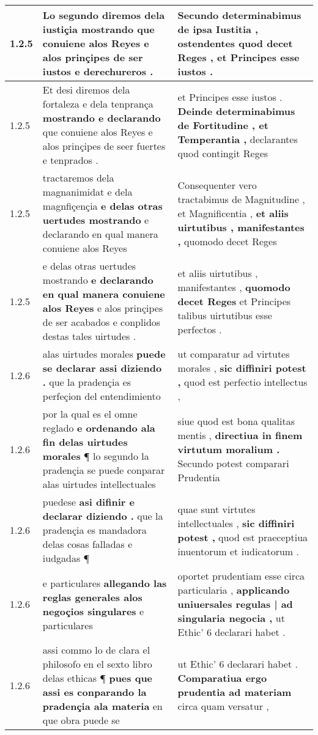 \begin{tabular}{|p{1cm}|p{6.5cm}|p{6.5cm}|}
1.2.5 & Lo segundo diremos dela iustiçia \textbf{ mostrando que conuiene alos Reyes } e alos prinçipes de ser iustos e derechureros . & Secundo determinabimus de ipsa Iustitia , \textbf{ ostendentes quod decet Reges , } et Principes esse iustos . \\\hline
1.2.5 & Et desi diremos dela fortaleza e dela tenprança \textbf{ mostrando e declarando } que conuiene alos Reyes e alos prinçipes de seer fuertes e tenprados . & et Principes esse iustos . \textbf{ Deinde determinabimus de Fortitudine , et Temperantia , } declarantes quod contingit Reges \\\hline
1.2.5 & tractaremos dela magnanimidat e dela magnfiçençia \textbf{ e delas otras uertudes mostrando } e declarando en qual manera conuiene alos Reyes & Consequenter vero tractabimus de Magnitudine , et Magnificentia , \textbf{ et aliis uirtutibus , manifestantes , } quomodo decet Reges \\\hline
1.2.5 & e delas otras uertudes mostrando \textbf{ e declarando en qual manera conuiene alos Reyes } e alos prinçipes de ser acabados e conplidos destas tales uirtudes . & et aliis uirtutibus , manifestantes , \textbf{ quomodo decet Reges } et Principes talibus uirtutibus esse perfectos . \\\hline
1.2.6 & alas uirtudes morales \textbf{ puede se declarar assi diziendo . } que la pradençia es perfeçion del entendimiento & ut comparatur ad virtutes morales , \textbf{ sic diffiniri potest , } quod est perfectio intellectus , \\\hline
1.2.6 & por la qual es el omne reglado \textbf{ e ordenando ala fin delas uirtudes morales } ¶ lo segundo la pradençia se puede conparar alas uirtudes intellectuales & siue quod est bona qualitas mentis , \textbf{ directiua in finem virtutum moralium . } Secundo potest comparari Prudentia \\\hline
1.2.6 & puedese \textbf{ asi difinir e declarar diziendo . } que la pradençia es mandadora delas cosas falladas e iudgadas ¶ & quae sunt virtutes intellectuales , \textbf{ sic diffiniri potest , } quod est praeceptiua inuentorum et iudicatorum . \\\hline
1.2.6 & e particulares \textbf{ allegando las reglas generales alos negoçios singulares } e particulares & oportet prudentiam esse circa particularia , \textbf{ applicando uniuersales regulas | ad singularia negocia , } ut Ethic’ 6 declarari habet . \\\hline
1.2.6 & assi commo lo de clara el philosofo en el sexto libro delas ethicas ¶ \textbf{ pues que assi es conparando la pradençia ala materia } en que obra puede se & ut Ethic’ 6 declarari habet . \textbf{ Comparatiua ergo prudentia ad materiam } circa quam versatur , \\\hline

\end{tabular}
